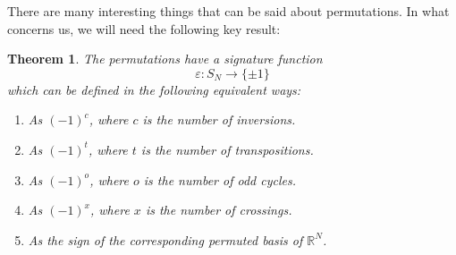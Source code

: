 \documentclass[12pt]{amsbook}
\newtheorem{theorem}{Theorem}[chapter]
\begin{document}
There are many interesting things that can be said about permutations. In what concerns us, we will need the following key result:


\begin{theorem}
The permutations have a signature function
$$\varepsilon:S_N\to\{\pm1\}$$
which can be defined in the following equivalent ways:
\begin{enumerate}
\item As $(-1)^c$, where $c$ is the number of inversions.

\item As $(-1)^t$, where $t$ is the number of transpositions.

\item As $(-1)^o$, where $o$ is the number of odd cycles.

\item As $(-1)^x$, where $x$ is the number of crossings.

\item As the sign of the corresponding permuted basis of $\mathbb R^N$.
\end{enumerate}
\end{theorem}
\end{document}
